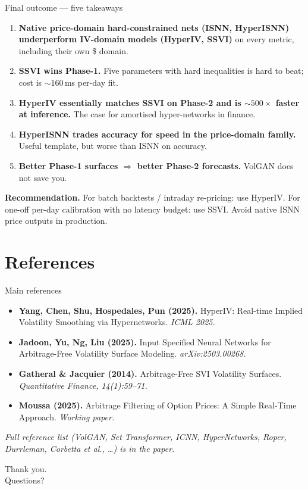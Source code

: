 \documentclass[10pt,aspectratio=169]{beamer}
\begin{document}
\begin{frame}{Final outcome --- five takeaways}
\begin{enumerate}\small
  \item \textbf{Native price-domain hard-constrained nets (ISNN, HyperISNN) underperform IV-domain models (HyperIV, SSVI)} on every metric, including their own \$ domain.
  \item \textbf{SSVI wins Phase-1.} Five parameters with hard inequalities is hard to beat; cost is $\sim$$160$\,ms per-day fit.
  \item \textbf{HyperIV essentially matches SSVI on Phase-2 and is $\sim 500\times$ faster at inference.} The case for amortised hyper-networks in finance.
  \item \textbf{HyperISNN trades accuracy for speed in the price-domain family.} Useful template, but worse than ISNN on accuracy.
  \item \textbf{Better Phase-1 surfaces $\Rightarrow$ better Phase-2 forecasts.} VolGAN does not save you.
\end{enumerate}\medskip

\textbf{Recommendation.} For batch backtests / intraday re-pricing: use HyperIV. For one-off per-day calibration with no latency budget: use SSVI. Avoid native ISNN price outputs in production.
\end{frame}

\section{References}

\begin{frame}{Main references}
\footnotesize
\begin{itemize}
  \item \textbf{Yang, Chen, Shu, Hospedales, Pun (2025).} HyperIV: Real-time Implied Volatility Smoothing via Hypernetworks. \textit{ICML 2025.}
  \item \textbf{Jadoon, Yu, Ng, Liu (2025).} Input Specified Neural Networks for Arbitrage-Free Volatility Surface Modeling. \textit{arXiv:2503.00268.}
  \item \textbf{Gatheral \& Jacquier (2014).} Arbitrage-Free SVI Volatility Surfaces. \textit{Quantitative Finance, 14(1):59--71.}
  \item \textbf{Moussa (2025).} Arbitrage Filtering of Option Prices: A Simple Real-Time Approach. \textit{Working paper.}
\end{itemize}\medskip
\centering \emph{Full reference list (VolGAN, Set Transformer, ICNN, HyperNetworks, Roper, Durrleman, Corbetta et al., \dots) is in the paper.}
\end{frame}

\begin{frame}
\centering
\Huge Thank you. \\[0.5em]
\large Questions?
\end{frame}
\end{document}
